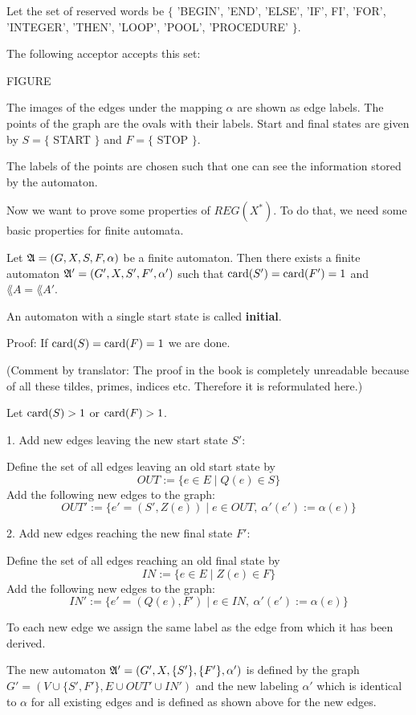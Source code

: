 Let the set of reserved words be 
$\{$ 'BEGIN', 'END', 'ELSE', 'IF', FI', 'FOR', 'INTEGER', 'THEN', 'LOOP',
'POOL', 'PROCEDURE' $\}$.

The following acceptor accepts this set:

FIGURE

The images of the edges under the mapping $\alpha$ are shown as edge labels. The
points of the graph are the ovals with their labels. Start and final states are
given by $S = \{$ START $\}$ and $F = \{$ STOP $\}$.

The labels of the points are chosen such that one can see the information stored
by the automaton.

Now we want to prove some properties of $REG(X^*)$. To do that, we need
some basic properties for finite automata.

\begin{lemma}
Let $\mbox{$\mathfrak{A}$} = (G, X, S, F, \alpha)$ be a finite automaton. Then there
exists a finite automaton $\mbox{$\mathfrak{A'}$} = (G', X, S', F', \alpha')$ such that
$\mathrm{card}(S') = \mathrm{card}(F') = 1$ and $\lang{A} = \lang{A'}$.
\end{lemma}

An automaton with a single start state is called {\bf initial}.

Proof: If $\mathrm{card}(S) = \mathrm{card}(F) = 1$ we are done.

(Comment by translator: The proof in the book is completely unreadable because
of all these tildes, primes, indices etc. Therefore it is reformulated here.) 

Let $\mathrm{card}(S) > 1$ or $\mathrm{card}(F) > 1$.

1. Add new edges leaving the new start state $S'$:

Define the set of all edges leaving an old start state by
\[ OUT := \{ e \in E \mid Q(e) \in S \} \]
Add the following new edges to the graph:
\[ OUT' := \{ e' = (S', Z(e)) \mid e \in OUT,\ \alpha'(e') := \alpha(e) \} \]

2. Add new edges reaching the new final state $F'$:

Define the set of all edges reaching an old final state by
\[ IN := \{ e \in E \mid Z(e) \in F \} \]
Add the following new edges to the graph:
\[ IN' := \{ e' = (Q(e), F') \mid e \in IN,\ \alpha'(e') := \alpha(e) \} \]

To each new edge we assign the same label as the edge from which it has been
derived.

The new automaton $\mbox{$\mathfrak{A'}$} = (G', X, \{S'\}, \{F'\}, \alpha')$ is defined
by the graph $G' = (V \cup \{ S', F' \}, E \cup OUT' \cup IN')$
and the new labeling $\alpha'$ which is identical to $\alpha$ for all existing edges and is defined as shown above for the new edges.

